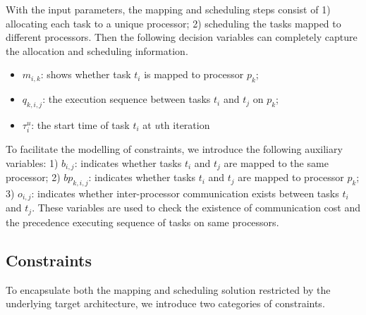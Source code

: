With the input parameters, the mapping and scheduling steps consist of 1) allocating each task to a unique processor; 2) scheduling the tasks mapped to different processors.
 Then the following decision variables can completely capture the allocation and scheduling information.
 \begin{itemize}
	\item $m_{i,k}$:  shows whether task $t_i$ is mapped to processor $p_k$;
	\item $q_{k,i,j}$: the execution sequence between tasks $t_i$ and $t_j$ on $p_k$;	
	\item $\tau^u_{i}$: the start time of task $t_i$ at $u$th iteration
\end{itemize}
To facilitate the modelling of constraints, we introduce the following auxiliary variables:
	1) $b_{i,j}$: indicates whether tasks $t_i$ and $t_j$ are mapped to the same processor;	2) $bp_{k,i,j}$: indicates whether tasks $t_i$ and $t_j$ are mapped to processor $p_k$;
	3) $o_{i,j}$: indicates whether inter-processor communication exists between tasks $t_i$ and $t_j$.
These variables are used to check the existence of communication cost and the precedence executing sequence of tasks on same processors.

\subsection{Constraints}
To encapsulate both the mapping and scheduling solution restricted by the underlying target architecture, 
 we introduce two categories of constraints. %
 
